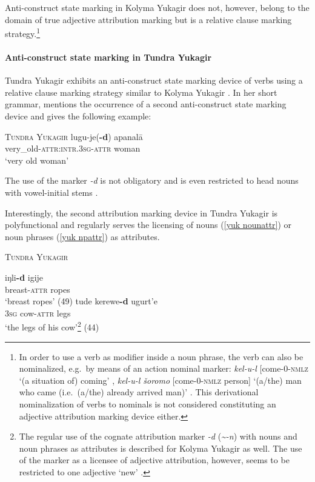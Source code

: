 Anti-construct state marking in Kolyma Yukagir does not, however, belong to the domain of true adjective attribution marking but is a relative clause marking strategy.\footnote{In order to use a verb as modifier inside a noun phrase, the verb can also be nominalized, e.g.~by means of an action nominal marker: \textit{kel-u-l} [come-0-\textsc{nmlz} ‘(a situation of) coming’ \cite[147]{maslova2003b}, \textit{kel-u-l šoromo} [come-0-\textsc{nmlz} person] ‘(a/the) man who came (i.e.~(a/the) already arrived man)’ \cite[67]{maslova2003b}. This derivational nominalization of verbs to nominals is not considered constituting an adjective attribution marking device either.}

\paragraph{Anti-construct state marking in Tundra Yukagir}
Tundra Yukagir exhibits an anti-construct state marking device of verbs using a relative clause marking strategy similar to Kolyma Yukagir \citep[49–50, elsewhere]{maslova2003a}. In her short grammar, \cite{maslova2003a} mentions the occurrence of a second anti-construct state marking device and gives the following example:
\begin{exe}
\ex 	\textsc{Tundra Yukagir} \citep[50]{maslova2003a}
\gll 	lugu-je(\textbf{-d}) apanalā\\
	very\_old-\textsc{attr:intr.3sg}-\textsc{attr} woman\\
\glt	‘very old woman’
\end{exe}
The use of the marker \textit{-d} is not obligatory and is even restricted to head nouns with vowel-initial stems \cite[50]{maslova2003a}.

Interestingly, the second attribution marking device in Tundra Yukagir is polyfunctional and regularly serves the licensing of nouns (\ref{yuk nounattr}) or noun phrases (\ref{yuk npattr}) as attributes.
\newpage
\begin{exe}
\ex \textsc{Tundra Yukagir} \citep{maslova2003a}
\begin{xlist}
\ex \label{yuk nounattr}
\gll	iŋli\textbf{-d} igije\\
	breast-\textsc{attr} ropes\\
\glt	‘breast ropes’ (49)
\ex \label{yuk npattr}
\gll	tude kerewe\textbf{-d} ugurt'e\\
	\textsc{3sg} cow-\textsc{attr} legs\\
\glt	‘the legs of his cow’\footnote{The regular use of the cognate attribution marker \textit{-d} (\textit{\textasciitilde-n}) with nouns and noun phrases as attributes is described for Kolyma Yukagir as well. The use of the marker as a licensee of adjective attribution, however, seems to be restricted to one adjective ‘new’ \citep[71]{maslova2003b}.} (44)
\end{xlist}
\end{exe}

